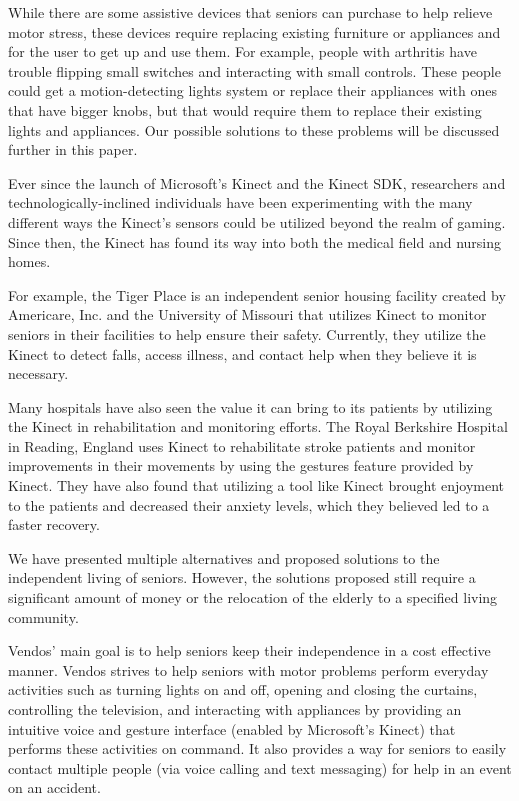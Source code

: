 \documentclass{chi-ext}
\begin{document}
While there are some assistive devices that seniors can purchase to help relieve motor stress, these devices require replacing existing furniture or appliances and for the user to get up and use them\cite{_assistive}.
For example, people with arthritis have trouble flipping small switches and interacting with small controls\cite{_assistive}.
These people could get a motion-detecting lights system or replace their appliances with ones that have bigger knobs, but that would require them to replace their existing lights and appliances.
Our possible solutions to these problems will be discussed further in this paper.

Ever since the launch of Microsoft's Kinect and the Kinect SDK, researchers and technologically-inclined individuals have been experimenting with the many different ways the Kinect's sensors could be utilized beyond the realm of gaming.
Since then, the Kinect has found its way into both the medical field and nursing homes.
 
For example, the Tiger Place is an independent senior housing facility created by Americare, Inc. and the University of Missouri that utilizes Kinect to monitor seniors in their facilities to help ensure their safety\cite{_kinect}.
Currently, they utilize the Kinect to detect falls, access illness, and contact help when they believe it is necessary\cite{_kinect}.
 
Many hospitals have also seen the value it can bring to its patients by utilizing the Kinect in rehabilitation and monitoring efforts.
The Royal Berkshire Hospital in Reading, England uses Kinect to rehabilitate stroke patients and monitor improvements in their movements by using the gestures feature provided by Kinect\cite{_kinect}.
They have also found that utilizing a tool like Kinect brought enjoyment to the patients and decreased their anxiety levels, which they believed led to a faster recovery\cite{_kinect}.
 
We have presented multiple alternatives and proposed solutions to the independent living of seniors.
However, the solutions proposed still require a significant amount of money or the relocation of the elderly to a specified living community.

Vendos' main goal is to help seniors keep their independence in a cost effective manner.
Vendos strives to help seniors with motor problems perform everyday activities such as turning lights on and off, opening and closing the curtains, controlling the television, and interacting with appliances by providing an intuitive voice and gesture interface (enabled by Microsoft's Kinect) that performs these activities on command. 
It also provides a way for seniors to easily contact multiple people (via voice calling and text messaging) for help in an event on an accident.
\end{document}
